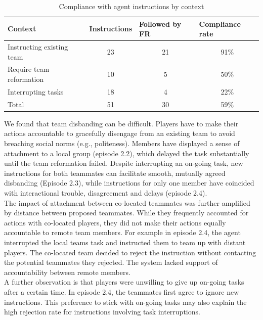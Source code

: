 \begin{table}[h]
\footnotesize
\begin{tabular}{l|ccc}
Context                   & \multicolumn{1}{l}{Instructions} & \multicolumn{1}{l}{Followed by FR} & \multicolumn{1}{l}{Compliance rate} \\ \hline
Instructing existing team & 23                               & 21                                 & 91\%                                \\
Require team reformation  & 10                               & 5                                  & 50\%                                \\
Interrupting tasks        & 18                               & 4                                  & 22\%                                \\
Total                     & 51                               & 30                                 & 59\%                               
\end{tabular}
\caption{Compliance with agent instructions by context}
\label{tab:compliancerate}
\end{table}

We found that team disbanding can be difficult. Players have to make their actions accountable to gracefully disengage from an existing team to avoid breaching social norms (e.g., politeness). Members have displayed a sense of attachment to a local group (episode 2.2), which delayed the task substantially until the team reformation failed. Despite interrupting an on-going task, new instructions for both teammates can facilitate smooth, mutually agreed disbanding (Episode 2.3), while instructions for only one member have coincided with interactional trouble, disagreement and delays (episode 2.4). \\

The impact of attachment between co-located teammates was further amplified by distance between proposed teammates. While they frequently accounted for actions with co-located players, they did not make their actions equally accountable to remote team members. For example in episode 2.4, the agent interrupted the local teams task and instructed them to team up with distant players. The co-located team decided to reject the instruction without contacting the potential teammates they rejected. The system lacked support of accountability between remote members. \\

A further observation is that players were unwilling to give up on-going tasks after a certain time. In episode 2.4, the teammates first agree to ignore new instructions. This preference to stick with on-going tasks may also explain the high rejection rate for instructions involving task interruptions. \\

